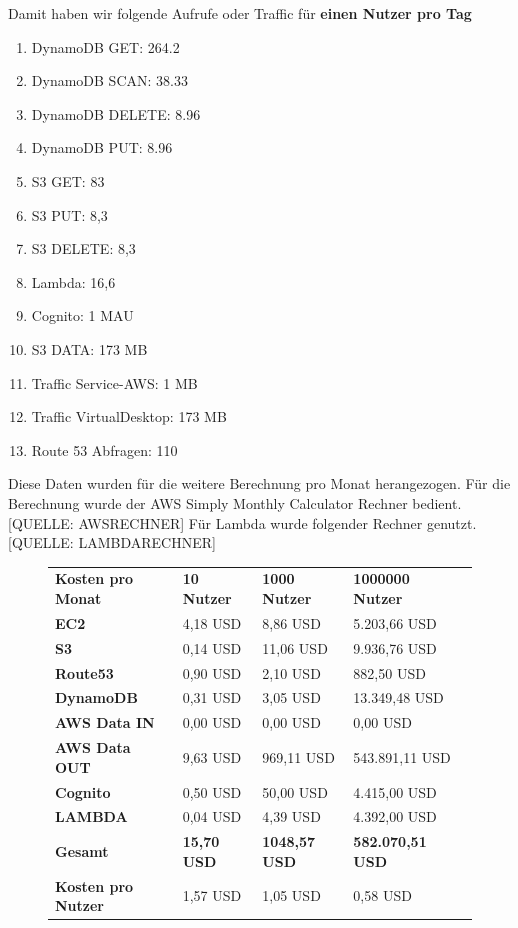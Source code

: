 \documentclass[a4paper, 12pt]{scrreprt}
\renewcommand\_{\textunderscore\allowbreak}
\begin{document}
Damit haben wir folgende Aufrufe oder Traffic für \textbf{einen Nutzer pro Tag}
\begin{enumerate}
\item DynamoDB GET: 264.2
\item DynamoDB SCAN: 38.33
\item DynamoDB DELETE: 8.96
\item DynamoDB PUT: 8.96
\item S3 GET: 83
\item S3 PUT: 8,3
\item S3 DELETE: 8,3
\item Lambda: 16,6
\item Cognito: 1 MAU
\item S3 DATA: 173 MB
\item Traffic Service-AWS: 1 MB
\item Traffic VirtualDesktop: 173 MB
\item Route 53 Abfragen: 110
\end{enumerate}
Diese Daten wurden für die weitere Berechnung pro Monat herangezogen.
Für die Berechnung wurde der AWS Simply Monthly Calculator Rechner bedient. [QUELLE: AWSRECHNER] Für Lambda wurde folgender Rechner genutzt. [QUELLE: LAMBDARECHNER]
\\

\begin{figure}[H]
\begin{tabular}{|l|l|l|l|l}
\cline{1-4}
      \textbf{Kosten pro Monat}    & \textbf{10 Nutzer} & \textbf{1000 Nutzer} & \textbf{1000000 Nutzer} &  \\ \cline{1-4}
\textbf{EC2} & 4,18 USD & 8,86 USD & 5.203,66 USD &  \\ 
\cline{1-4}
\textbf{S3} & 0,14 USD & 11,06 USD &     9.936,76 USD &  \\ 
\cline{1-4}
\textbf{Route53} & 0,90 USD & 2,10 USD & 882,50 USD &  \\ 
\cline{1-4}
\textbf{DynamoDB} & 0,31 USD & 3,05 USD & 13.349,48 USD &  \\ 
\cline{1-4}
\textbf{AWS Data IN} & 0,00 USD & 0,00 USD & 0,00 USD      &  \\ 
\cline{1-4}
\textbf{AWS Data OUT} & 9,63 USD & 969,11 USD & 543.891,11 USD &  \\
\cline{1-4}
\textbf{Cognito} & 0,50 USD & 50,00 USD & 4.415,00 USD &  \\ \cline{1-4}
\textbf{LAMBDA} & 0,04 USD & 4,39 USD & 4.392,00 USD &  \\ \cline{1-4}
\textbf{Gesamt} & \textbf{15,70 USD} & \textbf{1048,57 USD} & \textbf{582.070,51 USD} &  \\ \cline{1-4}
\textbf{Kosten pro Nutzer} & 1,57 USD & 1,05 USD & 0,58 USD &  \\ \cline{1-4}
\end{tabular}
\end{figure}
\end{document}
